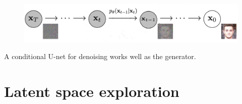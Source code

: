 \begin{figure}[H]
    \centering
    \includegraphics[width=0.65\linewidth]{./img/diffusion_model.png}
\end{figure}

\begin{remark}
    A conditional U-net for denoising works well as the generator.
\end{remark}



\section{Latent space exploration}

